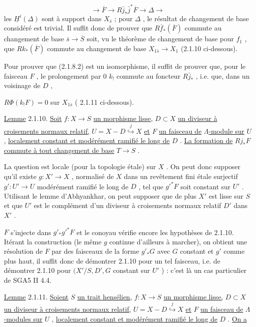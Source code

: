 \begin{equation*}
\longrightarrow \overline{F} \longrightarrow R\bar j_* \bar j^* \overline{F} \longrightarrow \Delta \longrightarrow
\end{equation*}
les $\underline{H}^i(\Delta)$ sont à support dans $X_{\bar s}$ ; pour $\Delta$ , le résultat de changement de base considéré est trivial. Il suffit donc de prouver que $R\bar f_*(\overline{F})$ commute au changement de base $\bar s \to \overline{S}$ soit, vu le théorème de changement de base pour $f_1$ , que
$Rk_*(\overline{F})$ commute au changement de base $X_{1\bar s} \to X_1$ (2.1.10 ci-dessous).

Pour prouver que (2.1.8.2) est un isomorphisme, il suffit de prouver que, pour le faisceau $F$ , le prolongement par $0$ $k_!$ commute au foncteur $R\bar j_*$ , i.e. que, dans un voisinage de $D$ ,

$R\Phi(k_! F) = 0$ sur $X_{1\bar s}$ ( 2.1.11 ci-dessous).

\underline{Lemme} 2.1.10. \underline{Soit} $f : X \to S$ \underline{un morphisme lisse,} $D \subset X$ \underline{un diviseur à croisements normaux relatif,} $U = X - D \stackrel{j}{\hookrightarrow} X$ \underline{et} $F$ \underline{un faisceau de} $\Lambda$\underline{-module sur} $U$ , \underline{localement constant et modérément ramifié le long de} $D$ . \underline{La formation de} $Rj_* F$ \underline{commute à tout changement de base} $T \to S$ .

La question est locale (pour la topologie étale) sur $X$ . On peut donc supposer qu'il existe $g : X' \to X$ , normalisé de $X$ dans un revêtement fini étale surjectif $g' : U' \to U$ modérément ramifié le long de $D$ , tel que $g'^* F$ soit constant sur $U'$ . Utilisant le lemme d'Abhyankhar, on peut supposer que de plus $X'$ est lisse sur $S$ et que $U'$ est le complément d'un diviseur à croisements normaux relatif $D'$ dans $X'$ .

$F$ s'injecte dans $g'_* g'^* F$ et le conoyau vérifie encore les hypothèses de 2.1.10. Itérant la construction (le même $g$ continue d'ailleurs à marcher), on obtient une résolution de $F$ par des faisceaux de la forme $g'_* G$ avec $G$ constant et $g'$ comme plus haut, il suffit donc de démontrer 2.1.10 pour un tel faisceau, i.e. de démontrer 2.1.10 pour $(X'/S, D', G$ constant sur $U'$ ) : c'est là un cas particulier de SGA5 II 4.4.

\underline{Lemme} 2.1.11. \underline{Soient} $S$ \underline{un trait hensélien,} $f : X \to S$ \underline{un morphisme lisse,} $D \subset X$ \underline{un diviseur à croisements normaux relatif,} $U = X - D \stackrel{j}{\hookrightarrow} X$ \underline{et} $F$ \underline{un faisceau de} $\Lambda$\underline{-modules sur} $U$ , \underline{localement constant et modérément ramifié le long de} $D$ . \underline{On a}

